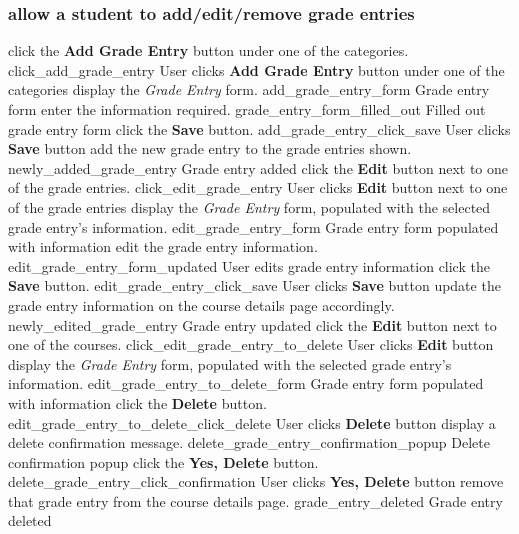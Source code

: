 \documentclass[12pt]{article}
\newenvironment{requirement}[1]
{
    \renewcommand{\thesubsubsection}{R\arabic{subsubsection}.}
    \renewcommand{\labelenumi}{
        \arabic{subsubsection}.\arabic{enumi}
    }
    \renewcommand{\labelenumii}{
        \arabic{subsubsection}.\arabic{enumi}.\arabic{enumii}
    }
    \renewcommand{\labelenumiii}{
        \arabic{subsubsection}.\arabic{enumi}.\arabic{enumii}.\arabic{enumiii}
    }
    \renewcommand{\labelenumiv}{
        \arabic{subsubsection}.\arabic{enumi}.\arabic{enumii}.\arabic{enumiii}.\arabic{enumiv}
    }
    \subsubsection{#1}
    \begin{enumerate}
}
{
    \end{enumerate}
}
\begin{document}
\begin{requirement}{\sysshall allow a student to add/edit/remove grade entries}
    \navcoursedetails
    \screenshotstep
      {\stushall click the \textbf{Add Grade Entry} button under one of the categories.}
      {click_add_grade_entry}
      {User clicks \textbf{Add Grade Entry} button under one of the categories}
    \screenshotstep
      {\sysshall display the \emph{Grade Entry} form.}
      {add_grade_entry_form}
      {Grade entry form}
    \screenshotstep
      {\stushall enter the information required.}
      {grade_entry_form_filled_out}
      {Filled out grade entry form}
    \screenshotstep
      {\stushall click the \textbf{Save} button.}
      {add_grade_entry_click_save}
      {User clicks \textbf{Save} button}
    \screenshotstep
      {\sysshall add the new grade entry to the grade entries shown.}
      {newly_added_grade_entry}
      {Grade entry added}
    \screenshotstep
      {\stushall click the \textbf{Edit} button next to one of the grade entries.}
      {click_edit_grade_entry}
      {User clicks \textbf{Edit} button next to one of the grade entries}
    \screenshotstep
      {\sysshall display the \emph{Grade Entry} form, populated with the selected grade entry's
      information.}
      {edit_grade_entry_form}
      {Grade entry form populated with information}
    \screenshotstep
      {\stushall edit the grade entry information.}
      {edit_grade_entry_form_updated}
      {User edits grade entry information}
    \screenshotstep
      {\stushall click the \textbf{Save} button.}
      {edit_grade_entry_click_save}
      {User clicks \textbf{Save} button}
    \screenshotstep
      {\sysshall update the grade entry information on the course details page accordingly.}
      {newly_edited_grade_entry}
      {Grade entry updated}
    \screenshotstep
      {\stushall click the \textbf{Edit} button next to one of the courses.}
      {click_edit_grade_entry_to_delete}
      {User clicks \textbf{Edit} button}
    \screenshotstep
      {\sysshall display the \emph{Grade Entry} form, populated with the selected grade entry's
      information.}
      {edit_grade_entry_to_delete_form}
      {Grade entry form populated with information}
    \screenshotstep
      {\stushall click the \textbf{Delete} button.}
      {edit_grade_entry_to_delete_click_delete}
      {User clicks \textbf{Delete} button}
    \screenshotstep
      {\sysshall display a delete confirmation message.}
      {delete_grade_entry_confirmation_popup}
      {Delete confirmation popup}
    \screenshotstep
      {\stushall click the \textbf{Yes, Delete} button.}
      {delete_grade_entry_click_confirmation}
      {User clicks \textbf{Yes, Delete} button}
    \screenshotstep
      {\sysshall remove that grade entry from the course details page.}
      {grade_entry_deleted}
      {Grade entry deleted}
\end{requirement}
\end{document}
